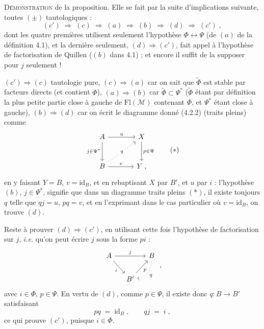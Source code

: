\documentclass[11pt]{article}
\newcommand{\printedpage}[1]{\marginpar{\footnotesize p.~#1}}
\newcommand{\msp}[1]{\marginpar{\footnotesize [#1]}}
\newcommand{\Fl}{\mathrm{Fl}}
\newcommand{\id}{\mathrm{id}}
\begin{document}
\textsc{Démonstration} de la proposition. Elle se fait par la suite d'implications suivante, toutes $(\pm)$ tautologiques :
\[
(c') \;\Longrightarrow\; (c) \;\Longrightarrow\; (a) \;\Longrightarrow\; (b) \;\Longrightarrow\; (d) \;\Longrightarrow\; (c')\;,
\]
\msp{page 30}
dont les quatre premières utilisent seulement l'hypothèse $\Phi\longleftrightarrow\Psi$ (de $(a)$ de la définition 4.1), et la dernière seulement, $(d)\Longrightarrow(c')$, fait appel à l'hypothèse de factorisation de Quillen ($(b)$ dans 4.1) ; et encore il suffit de la supposer pour $j$ seulement !

$(c')\Longrightarrow(c)$ tautologie pure, $(c)\Longrightarrow(a)$ car on sait que $\widetilde{\Phi}$ est stable par facteurs directs (et contient $\Phi$), $(a)\Longrightarrow(b)$ car $\widetilde{\Phi}\subset\Psi^*$ ($\widetilde{\Phi}$ étant par définition la plus petite partie close à gauche de $\Fl(\mathcal{M})$ contenant $\Phi$, et $\Psi^*$ étant close à gauche), $(b)\Longrightarrow(d)$ car on écrit le diagramme donné (4.2.2) (traits pleins) comme %
\[
\begin{tikzcd}[row sep=large, column sep=large]
A \arrow[r, "u"] \arrow[d, "j\in\Psi^*"'] & X \arrow[d, "p\in\Psi"] \\
B \arrow[ur, dotted, "q" description] \arrow[r, "v"] & Y \;,
\end{tikzcd}
\tag*{$(*)$}
\]
en y faisant $Y=B$, $v=\id_B$, et en rebaptisant $X$ par $B'$, et $u$ par $i$ : l'hypothèse $(b)$, $j\in\Psi^*$, signifie que dans un diagramme traits pleins $(*)$, il existe toujours $q$ telle que $qj=u$, $pq=v$, et en l'exprimant dans le cas particulier où $v=\id_B$, on trouve $(d)$.

Reste à prouver $(d)\Longrightarrow(c')$, en utilisant cette fois l'hypothèse de factorisation sur $j$, \textit{i.e.} qu'on peut écrire $j$ sous la forme $pi$ :
\[
\begin{tikzcd}[column sep=small]
A \arrow[rr, "j"] \arrow[dr, "i"'] & & B \arrow[dl, dotted, bend left=40, "q"] \\
& B' \arrow[ur, "p"'] &
\end{tikzcd}
\;,
\]
avec $i\in\Phi$, $p\in\Psi$. En vertu de $(d)$, comme $p\in\Psi$, il existe donc $q:B\longrightarrow B'$ satisfaisant
\printedpage{21}
\msp{page 31}
\[
pq \;=\; \id_B\;, \qquad qj \;=\; i\;,
\]
ce qui prouve $(c')$, puisque $i\in\Phi$.
\end{document}
